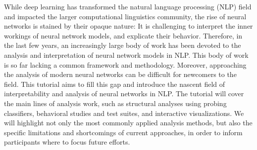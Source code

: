 While deep learning has transformed the natural language processing (NLP) field and impacted the larger computational linguistics community, the rise of neural networks is stained by their opaque nature: It is challenging to interpret the inner workings of neural network models, and explicate their behavior. Therefore, in the last few years, an increasingly large body of work has been devoted to the analysis and interpretation of neural network models in NLP. This body of work is so far lacking a common framework and methodology. Moreover, approaching the analysis of modern neural networks can be difficult for newcomers to the field. This tutorial aims to fill this gap and introduce the nascent field of interpretability and analysis of neural networks in NLP. The tutorial will cover the main lines of analysis work, such as structural analyses using probing classifiers, behavioral studies and test suites, and interactive visualizations. We will highlight not only the most commonly applied analysis methods, but also the specific limitations and shortcomings of current approaches, in order to inform participants where to focus future efforts.
